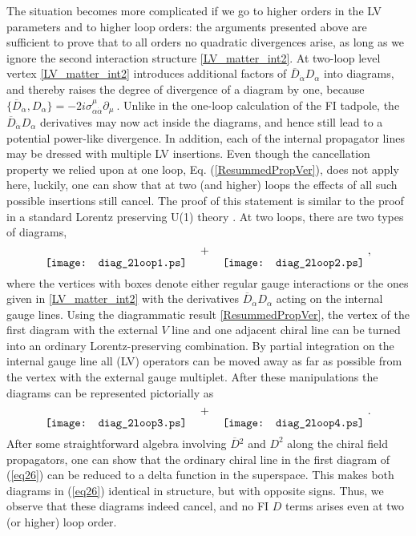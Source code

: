 \documentclass[12pt]{revtex4}
\begin{document}
The situation becomes more complicated if we go to higher orders in 
the LV parameters and to higher loop orders: the arguments 
presented above are sufficient to
prove that to all orders no quadratic divergences arise, as long as we
ignore the second interaction structure \eqref{LV_matter_int2}. At two-loop 
level vertex \eqref{LV_matter_int2} introduces additional factors of $\overline{D}_{\dot\alpha}
D_\alpha$ into diagrams, and thereby raises 
the degree of divergence of a diagram by one, because 
\(
\{\overline{D}_{\dot\alpha}, D_\alpha\} = 
-2 i \sigma_{\alpha\dot\alpha}^\mu \partial_\mu~.
\) 
Unlike in the one-loop calculation of the FI tadpole, the 
$\overline{D}_{\dot\alpha} D_\alpha$ derivatives may now act inside
the diagrams, and hence still lead to a potential power-like
divergence. In addition, each of the internal propagator lines may be
dressed with multiple LV insertions. Even though the cancellation
property we relied upon at one loop, Eq. (\ref{ResummedPropVer}), does
not apply here,  luckily, one can show that at two (and higher) loops
the effects of all such possible insertions still cancel. The proof of
this statement is similar to the proof in a standard Lorentz
preserving U(1) theory \cite{Fischler:1981zk}. At two loops, there are
two types of diagrams, 
%
\begin{equation}
\raisebox{-2.5ex}{\texttt{[image: diag\_2loop1.ps]}}
\quad + \quad 
\raisebox{-2.5ex}{\texttt{[image: diag\_2loop2.ps]}}
~,
\end{equation} 
%
where the vertices with boxes denote either regular gauge interactions or
the ones given in \eqref{LV_matter_int2} with the derivatives
$\overline{D}_{\dot\alpha} D_\alpha$ acting on the internal gauge lines. 
Using the diagrammatic result \eqref{ResummedPropVer}, the vertex of 
the first diagram with the external $V$ line and one adjacent chiral
line can be turned into an ordinary Lorentz-preserving combination. 
By partial integration on
the internal gauge line all (LV) operators can be moved away as far as
possible from the vertex with the external gauge multiplet. After
these manipulations the diagrams can be represented pictorially as  
%
\begin{equation}
\raisebox{-2.5ex}{\texttt{[image: diag\_2loop3.ps]}}
\quad + \quad 
\raisebox{-2.5ex}{\texttt{[image: diag\_2loop4.ps]}}
~.
\label{eq26}
\end{equation} 
%
After some straightforward algebra involving $\overline{D}{}^2$ and 
$D^2$ along the chiral field propagators, one can show that 
the ordinary chiral line in the first diagram of (\ref{eq26}) 
can be reduced to a delta function in the superspace.
This makes both diagrams in (\ref{eq26}) identical in structure, but
with opposite signs. Thus, we observe that these diagrams indeed
cancel, and no FI $D$ terms arises even at two (or higher) loop order.  
\end{document}
